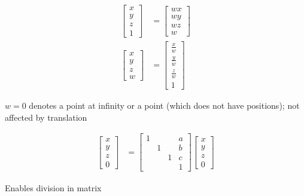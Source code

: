   \begin{align}
    \begin{bmatrix}
      x \\
      y \\
      z \\
      1
    \end{bmatrix}
    &=
    \begin{bmatrix}
      wx \\
      wy \\
      wz \\
      w
    \end{bmatrix} \\
    \begin{bmatrix}
      x \\
      y \\
      z \\
      w
    \end{bmatrix}
    &=
    \begin{bmatrix}
      \frac{x}{w} \\
      \frac{y}{w} \\
      \frac{z}{w} \\
      1
    \end{bmatrix}
  \end{align}

  $ w = 0 $ denotes a point at infinity or a point (which does not have
  positions); not affected by translation

  \begin{align}
    \begin{bmatrix}
      x \\
      y \\
      z \\
      0
    \end{bmatrix}
    &=
    \begin{bmatrix}
      1 & & & a \\
      & 1 & & b \\
      & & 1 & c \\
      & & & 1
    \end{bmatrix}
    \begin{bmatrix}
      x \\
      y \\
      z \\
      0
    \end{bmatrix}
  \end{align}

  Enables division in matrix

